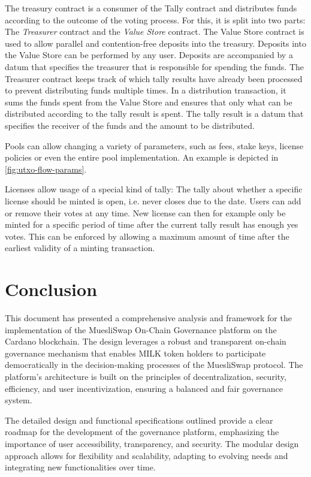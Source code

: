 \documentclass[11pt]{article}
\begin{document}
The treasury contract is a consumer of the Tally contract and distributes funds according to the outcome of the voting process.
For this, it is split into two parts: The \emph{Treasurer} contract and the \emph{Value Store} contract.
The Value Store contract is used to allow parallel and contention-free deposits into the treasury.
Deposits into the Value Store can be performed by any user.
Deposits are accompanied by a datum that specifies the treasurer that is responsible for spending the funds.
The Treasurer contract keeps track of which tally results have already been processed to prevent distributing funds multiple times.
In a distribution transaction, it sums the funds spent from the Value Store and ensures that only what can be distributed according to the tally result is spent.
The tally result is a datum that specifies the receiver of the funds and the amount to be distributed.

Pools can allow changing a variety of parameters, such as fees, stake keys, license policies or even the entire pool implementation.
An example is depicted in \cref{fig:utxo-flow-params}.

Licenses allow usage of a special kind of tally: The tally about whether a specific license should be minted
is open, i.e. never closes due to the date. Users can add or remove their votes at any time.
New license can then for example only be minted for a specific period of time after the current tally result has enough yes votes.
This can be enforced by allowing a maximum amount of time after the earliest validity of a minting transaction.




\section{Conclusion}

This document has presented a comprehensive analysis and framework for the implementation of the MuesliSwap On-Chain Governance platform on the Cardano blockchain. The design leverages a robust and transparent on-chain governance mechanism that enables MILK token holders to participate democratically in the decision-making processes of the MuesliSwap protocol. The platform's architecture is built on the principles of decentralization, security, efficiency, and user incentivization, ensuring a balanced and fair governance system.

The detailed design and functional specifications outlined provide a clear roadmap for the development of the governance platform, emphasizing the importance of user accessibility, transparency, and security.
The modular design approach allows for flexibility and scalability, adapting to evolving needs and integrating new functionalities over time.
\end{document}
